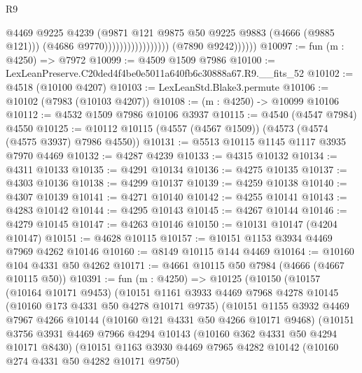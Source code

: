 \begin{lexlean}{R9}
\begin{coremodule}
                                              @4469
                                              @9225
                                              @4239
                                              (@9871
                                                @121
                                                @9875
                                                @50
                                                @9225
                                                @9883
                                                (@4666 (@9885 @121)))
                                              (@4686 @9770)))))))))))))))))
              (@7890 @9242))))))
@10097 := fun (m : @4250) => @7972
@10099 := @4509 @1509 @7986
@10100 := LexLeanPreserve.C20ded4f4be0e5011a640fb6c30888a67.R9.__fits_52
@10102 := @4518 (@10100 @4207)
@10103 := LexLeanStd.Blake3.permute
@10106 := @10102 (@7983 (@10103 @4207))
@10108 := (m : @4250) -> @10099 @10106
@10112 := @4532 @1509 @7986 @10106 @3937
@10115 := @4540 (@4547 @7984) @4550
@10125 := @10112 @10115 (@4557 (@4567 @1509)) (@4573 (@4574 (@4575 @3937) @7986 @4550))
@10131 := @5513 @10115 @1145 @1117 @3935 @7970 @4469
@10132 := @4287 @4239
@10133 := @4315 @10132
@10134 := @4311 @10133
@10135 := @4291 @10134
@10136 := @4275 @10135
@10137 := @4303 @10136
@10138 := @4299 @10137
@10139 := @4259 @10138
@10140 := @4307 @10139
@10141 := @4271 @10140
@10142 := @4255 @10141
@10143 := @4283 @10142
@10144 := @4295 @10143
@10145 := @4267 @10144
@10146 := @4279 @10145
@10147 := @4263 @10146
@10150 := @10131 @10147 (@4204 @10147)
@10151 := @4628 @10115
@10157 := @10151 @1153 @3934 @4469 @7969 @4262 @10146
@10160 := @8149 @10115 @144 @4469
@10164 := @10160 @104 @4331 @50 @4262
@10171 := @4661 @10115 @50 @7984 (@4666 (@4667 @10115 @50))
@10391 := fun (m : @4250) =>
  @10125
    (@10150
      (@10157
        (@10164 @10171 @9453)
        (@10151
          @1161
          @3933
          @4469
          @7968
          @4278
          @10145
          (@10160 @173 @4331 @50 @4278 @10171 @9735)
          (@10151
            @1155
            @3932
            @4469
            @7967
            @4266
            @10144
            (@10160 @121 @4331 @50 @4266 @10171 @9468)
            (@10151
              @3756
              @3931
              @4469
              @7966
              @4294
              @10143
              (@10160 @362 @4331 @50 @4294 @10171 @8430)
              (@10151
                @1163
                @3930
                @4469
                @7965
                @4282
                @10142
                (@10160 @274 @4331 @50 @4282 @10171 @9750)

\end{coremodule}
\end{lexlean}
